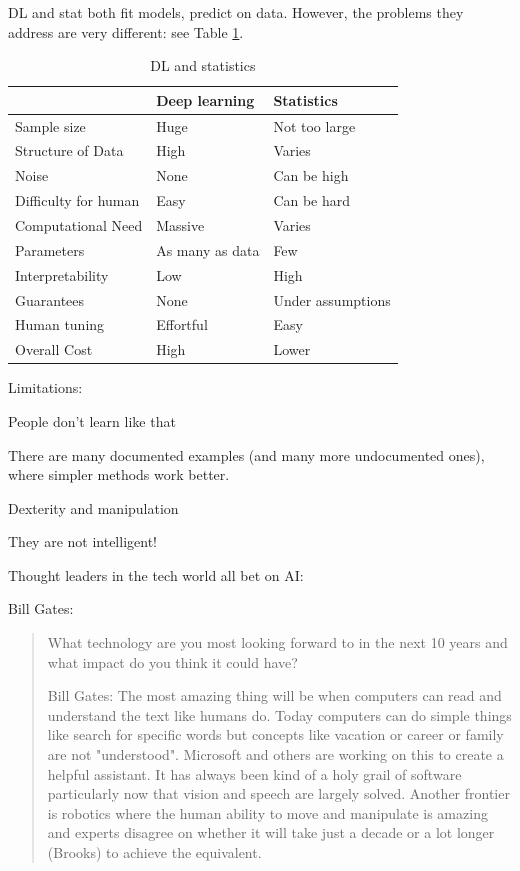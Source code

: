 \documentclass[english]{article}
\begin{document}
DL and stat both fit models, predict on data. However, the problems they address are very different: see Table \ref{my-label}.  

\renewcommand{\arraystretch}{1.5}
\begin{table}[]
\centering

\caption{DL and statistics}
\label{my-label}
\begin{tabular}{|l|l|l|}
\hline
                     & Deep learning & Statistics  \\ \hline
Sample size          & Huge          & Not too large       \\\hline  
Structure of Data       & High          & Varies      \\ \hline
Noise       & None          & Can be high      \\ \hline
Difficulty for human & Easy          & Can be hard \\ \hline
Computational Need        & Massive       & Varies      \\ \hline
Parameters    & As many as data          & Few        \\ \hline
Interpretability     & Low           & High        \\ \hline
Guarantees     & None           & Under assumptions        \\ \hline
Human tuning              & Effortful     & Easy        \\ \hline
Overall Cost         & High          & Lower         \\ \hline
\end{tabular}
\end{table}

\item  Limitations: 

People don't learn like that

There are many documented examples (and many more undocumented ones), where simpler methods work better. 

Dexterity and manipulation 

They are not intelligent!


\item Thought leaders in the tech world all bet on AI: 

Bill Gates:

\begin{quote}
What technology are you most looking forward to in the next 10 years and what impact do you think it could have?

Bill Gates:
The most amazing thing will be when computers can read and understand the text like humans do. Today computers can do simple things like search for specific words but concepts like vacation or career or family are not "understood". Microsoft and others are working on this to create a helpful assistant. It has always been kind of a holy grail of software particularly now that vision and speech are largely solved. Another frontier is robotics where the human ability to move and manipulate is amazing and experts disagree on whether it will take just a decade or a lot longer (Brooks) to achieve the equivalent.
\end{quote}
\end{document}
